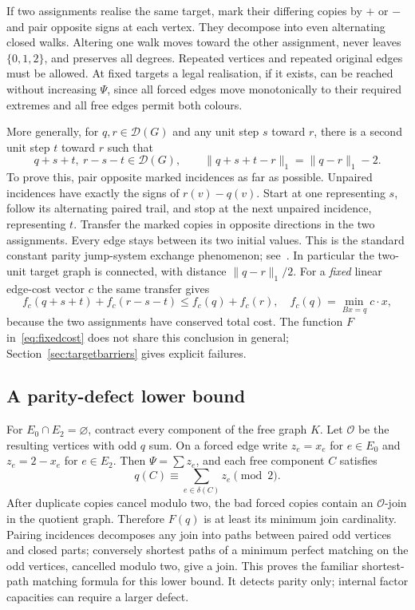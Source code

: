 If two assignments realise the same target, mark their differing
copies by $+$ or $-$ and pair opposite signs at each vertex. They
decompose into even alternating closed walks. Altering one walk
moves toward the other assignment, never leaves $\{0,1,2\}$, and
preserves all degrees. Repeated vertices and repeated original edges
must be allowed. At fixed targets a legal realisation, if it exists,
can be reached without increasing $\Psi$, since all forced edges
move monotonically to their required extremes and all free edges
permit both colours.

More generally, for $q,r\in\mathcal D(G)$ and any unit step $s$
toward $r$, there is a second unit step $t$ toward $r$ such that
\[
 q+s+t,\ r-s-t\in\mathcal D(G),\qquad
 \|q+s+t-r\|_1=\|q-r\|_1-2.
\]
To prove this, pair opposite marked incidences as far as possible.
Unpaired incidences have exactly the signs of $r(v)-q(v)$. Start at
one representing $s$, follow its alternating paired trail, and stop
at the next unpaired incidence, representing $t$. Transfer the marked
copies in opposite directions in the two assignments. Every edge
stays between its two initial values. This is the standard constant
parity jump-system exchange phenomenon; see~\cite{BC95}. In particular
the two-unit target graph is connected, with distance
$\|q-r\|_1/2$. For a \emph{fixed} linear edge-cost vector $c$ the
same transfer gives
\[
 f_c(q+s+t)+f_c(r-s-t)\le f_c(q)+f_c(r),\quad
 f_c(q)=\min_{Bx=q}c\cdot x,
\]
because the two assignments have conserved total cost. The function
$F$ in~\eqref{eq:fixedcost} does not share this conclusion in general;
Section~\ref{sec:targetbarriers} gives explicit failures.

\subsection{A parity-defect lower bound}

For $E_0\cap E_2=\varnothing$, contract every component of the free
graph $K$. Let $\mathcal O$ be the resulting vertices with odd $q$
sum. On a forced edge write $z_e=x_e$ for $e\in E_0$ and
$z_e=2-x_e$ for $e\in E_2$. Then $\Psi=\sum z_e$, and each free
component $C$ satisfies
\[
 q(C)\equiv\sum_{e\in\delta(C)}z_e\pmod2.
\]
After duplicate copies cancel modulo two, the bad forced copies
contain an $\mathcal O$-join in the quotient graph. Therefore
$F(q)$ is at least its minimum join cardinality. Pairing incidences
decomposes any join into paths between paired odd vertices and
closed parts; conversely shortest paths of a minimum perfect matching
on the odd vertices, cancelled modulo two, give a join. This proves
the familiar shortest-path matching formula for this lower bound.
It detects parity only; internal factor capacities can require a
larger defect.

